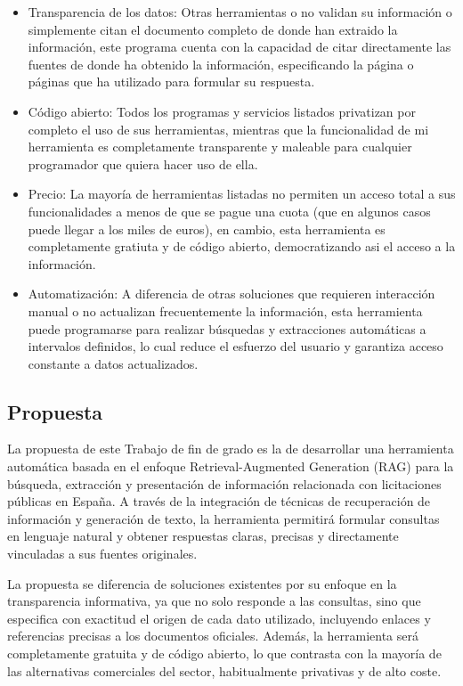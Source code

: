 \documentclass{article}
\begin{document}
\begin{itemize}

\item{Transparencia de los datos:}
Otras herramientas o no validan su información o simplemente citan el documento completo de donde han extraido la información, este programa cuenta con la capacidad de citar directamente las fuentes de donde ha obtenido la información, especificando la página o páginas que ha utilizado para formular su respuesta.

\item{Código abierto:}
Todos los programas y servicios listados privatizan por completo el uso de sus herramientas, mientras que la funcionalidad de mi herramienta es completamente transparente y maleable para cualquier programador que quiera hacer uso de ella.

\item{Precio:}
La mayoría de herramientas listadas no permiten un acceso total a sus funcionalidades a menos de que se pague una cuota (que en algunos casos puede llegar a los miles de euros), en cambio, esta herramienta es completamente gratiuta y de código abierto, democratizando asi el acceso a la información.

\item{Automatización:} 
A diferencia de otras soluciones que requieren interacción manual o no actualizan frecuentemente la información, esta herramienta puede programarse para realizar búsquedas y extracciones automáticas a intervalos definidos, lo cual reduce el esfuerzo del usuario y garantiza acceso constante a datos actualizados.

\end{itemize}

\subsection{Propuesta}
La propuesta de este Trabajo de fin de grado es la de desarrollar una herramienta automática basada en el enfoque Retrieval-Augmented Generation (RAG) para la búsqueda, extracción y presentación de información relacionada con licitaciones públicas en España. A través de la integración de técnicas de recuperación de información y generación de texto, la herramienta permitirá formular consultas en lenguaje natural y obtener respuestas claras, precisas y directamente vinculadas a sus fuentes originales.

La propuesta se diferencia de soluciones existentes por su enfoque en la transparencia informativa, ya que no solo responde a las consultas, sino que especifica con exactitud el origen de cada dato utilizado, incluyendo enlaces y referencias precisas a los documentos oficiales. Además, la herramienta será completamente gratuita y de código abierto, lo que contrasta con la mayoría de las alternativas comerciales del sector, habitualmente privativas y de alto coste.
\end{document}
